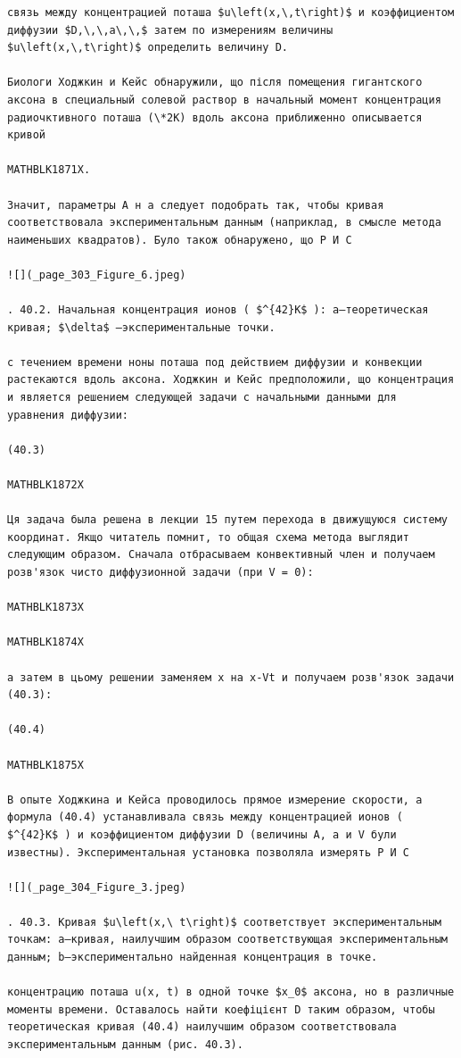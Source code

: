 \documentclass[
  ukrainian,
]{article}
\begin{document}
\begin{verbatim}
связь между концентрацией поташа $u\left(x,\,t\right)$ и коэффициентом диффузии $D,\,\,a\,\,$ затем по измерениям величины $u\left(x,\,t\right)$ определить величину D.

Биологи Ходжкин и Кейс обнаружили, що після помещения гигантского аксона в специальный солевой раствор в начальный момент концентрация радиочктивного поташа (\*2K) вдоль аксона приближенно описывается кривой

MATHBLK1871X.

Значит, параметры A н a следует подобрать так, чтобы кривая соответствовала экспериментальным данным (наприклад, в смысле метода наименьших квадратов). Було також обнаружено, що Р И С

![](_page_303_Figure_6.jpeg)

. 40.2. Начальная концентрация ионов ( $^{42}K$ ): a—теоретическая кривая; $\delta$ —экспериментальные точки.

с течением времени ноны поташа под действием диффузии и конвекции растекаются вдоль аксона. Ходжкин и Кейс предположили, що концентрация и является решением следующей задачи с начальными данными для уравнения диффузии:

(40.3) 

MATHBLK1872X

Ця задача была решена в лекции 15 путем перехода в движущуюся систему координат. Якщо читатель помнит, то общая схема метода выглядит следующим образом. Сначала отбрасываем конвективный член и получаем розв'язок чисто диффузионной задачи (при V = 0):

MATHBLK1873X

MATHBLK1874X

а затем в цьому решении заменяем x на x-Vt и получаем розв'язок задачи (40.3):

(40.4) 

MATHBLK1875X

В опыте Ходжкина и Кейса проводилось прямое измерение скорости, а формула (40.4) устанавливала связь между концентрацией ионов ( $^{42}K$ ) и коэффициентом диффузии D (величины A, a и V були известны). Экспериментальная установка позволяла измерять Р И С

![](_page_304_Figure_3.jpeg)

. 40.3. Кривая $u\left(x,\ t\right)$ соответствует экспериментальным точкам: a—кривая, наилучшим образом соответствующая экспериментальным данным; b—экспериментально найденная концентрация в точке.

концентрацию поташа u(x, t) в одной точке $x_0$ аксона, но в различные моменты времени. Оставалось найти коефіцієнт D таким образом, чтобы теоретическая кривая (40.4) наилучшим образом соответствовала экспериментальным данным (рис. 40.3).


\end{verbatim}
\end{document}
